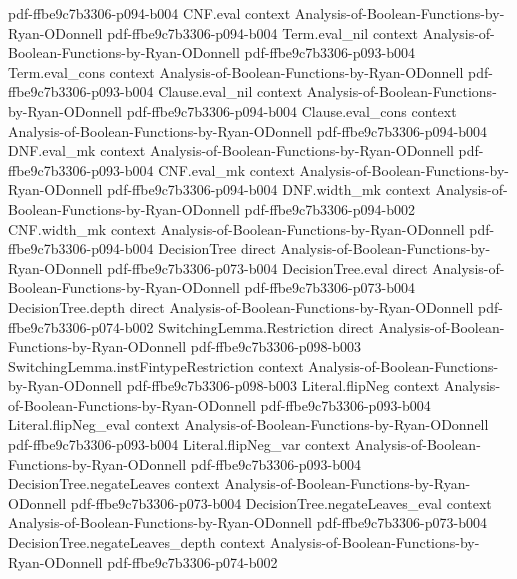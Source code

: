 \begin{lemma}
  {pdf-ffbe9c7b3306-p094-b004}
\proofstep
  {CNF.eval}
  {context}
  {Analysis-of-Boolean-Functions-by-Ryan-ODonnell}
  {pdf-ffbe9c7b3306-p094-b004}
\proofstep
  {Term.eval_nil}
  {context}
  {Analysis-of-Boolean-Functions-by-Ryan-ODonnell}
  {pdf-ffbe9c7b3306-p093-b004}
\proofstep
  {Term.eval_cons}
  {context}
  {Analysis-of-Boolean-Functions-by-Ryan-ODonnell}
  {pdf-ffbe9c7b3306-p093-b004}
\proofstep
  {Clause.eval_nil}
  {context}
  {Analysis-of-Boolean-Functions-by-Ryan-ODonnell}
  {pdf-ffbe9c7b3306-p094-b004}
\proofstep
  {Clause.eval_cons}
  {context}
  {Analysis-of-Boolean-Functions-by-Ryan-ODonnell}
  {pdf-ffbe9c7b3306-p094-b004}
\proofstep
  {DNF.eval_mk}
  {context}
  {Analysis-of-Boolean-Functions-by-Ryan-ODonnell}
  {pdf-ffbe9c7b3306-p093-b004}
\proofstep
  {CNF.eval_mk}
  {context}
  {Analysis-of-Boolean-Functions-by-Ryan-ODonnell}
  {pdf-ffbe9c7b3306-p094-b004}
\proofstep
  {DNF.width_mk}
  {context}
  {Analysis-of-Boolean-Functions-by-Ryan-ODonnell}
  {pdf-ffbe9c7b3306-p094-b002}
\proofstep
  {CNF.width_mk}
  {context}
  {Analysis-of-Boolean-Functions-by-Ryan-ODonnell}
  {pdf-ffbe9c7b3306-p094-b004}
\proofstep
  {DecisionTree}
  {direct}
  {Analysis-of-Boolean-Functions-by-Ryan-ODonnell}
  {pdf-ffbe9c7b3306-p073-b004}
\proofstep
  {DecisionTree.eval}
  {direct}
  {Analysis-of-Boolean-Functions-by-Ryan-ODonnell}
  {pdf-ffbe9c7b3306-p073-b004}
\proofstep
  {DecisionTree.depth}
  {direct}
  {Analysis-of-Boolean-Functions-by-Ryan-ODonnell}
  {pdf-ffbe9c7b3306-p074-b002}
\proofstep
  {SwitchingLemma.Restriction}
  {direct}
  {Analysis-of-Boolean-Functions-by-Ryan-ODonnell}
  {pdf-ffbe9c7b3306-p098-b003}
\proofstep
  {SwitchingLemma.instFintypeRestriction}
  {context}
  {Analysis-of-Boolean-Functions-by-Ryan-ODonnell}
  {pdf-ffbe9c7b3306-p098-b003}
\proofstep
  {Literal.flipNeg}
  {context}
  {Analysis-of-Boolean-Functions-by-Ryan-ODonnell}
  {pdf-ffbe9c7b3306-p093-b004}
\proofstep
  {Literal.flipNeg_eval}
  {context}
  {Analysis-of-Boolean-Functions-by-Ryan-ODonnell}
  {pdf-ffbe9c7b3306-p093-b004}
\proofstep
  {Literal.flipNeg_var}
  {context}
  {Analysis-of-Boolean-Functions-by-Ryan-ODonnell}
  {pdf-ffbe9c7b3306-p093-b004}
\proofstep
  {DecisionTree.negateLeaves}
  {context}
  {Analysis-of-Boolean-Functions-by-Ryan-ODonnell}
  {pdf-ffbe9c7b3306-p073-b004}
\proofstep
  {DecisionTree.negateLeaves_eval}
  {context}
  {Analysis-of-Boolean-Functions-by-Ryan-ODonnell}
  {pdf-ffbe9c7b3306-p073-b004}
\proofstep
  {DecisionTree.negateLeaves_depth}
  {context}
  {Analysis-of-Boolean-Functions-by-Ryan-ODonnell}
  {pdf-ffbe9c7b3306-p074-b002}
\proofstep

\end{lemma}
